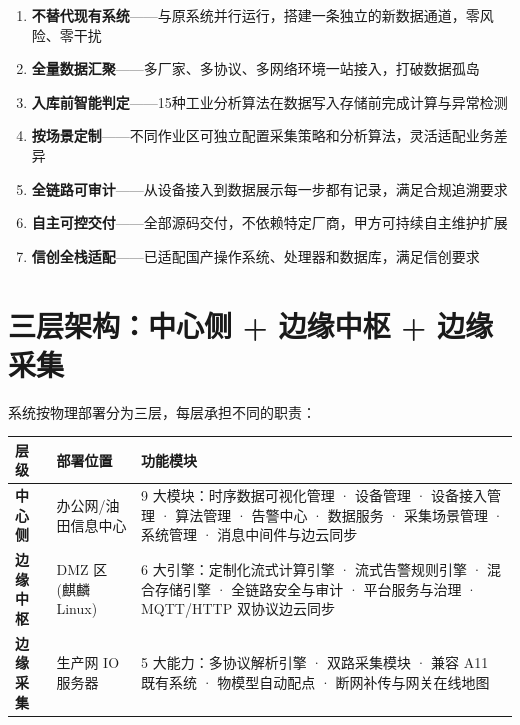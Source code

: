 \documentclass[11pt,a4paper]{ctexart}
\begin{document}
\begin{enumerate}[leftmargin=*]
  \item \textbf{不替代现有系统}——与原系统并行运行，搭建一条独立的新数据通道，零风险、零干扰
  \item \textbf{全量数据汇聚}——多厂家、多协议、多网络环境一站接入，打破数据孤岛
  \item \textbf{入库前智能判定}——15种工业分析算法在数据写入存储前完成计算与异常检测
  \item \textbf{按场景定制}——不同作业区可独立配置采集策略和分析算法，灵活适配业务差异
  \item \textbf{全链路可审计}——从设备接入到数据展示每一步都有记录，满足合规追溯要求
  \item \textbf{自主可控交付}——全部源码交付，不依赖特定厂商，甲方可持续自主维护扩展
  \item \textbf{信创全栈适配}——已适配国产操作系统、处理器和数据库，满足信创要求
\end{enumerate}

\section{三层架构：中心侧 + 边缘中枢 + 边缘采集}

系统按物理部署分为三层，每层承担不同的职责：

\begin{table}[H]\centering
\begin{tabular}{p{3cm}p{5.5cm}p{5.5cm}}
\toprule
\textbf{层级} & \textbf{部署位置} & \textbf{功能模块} \\
\midrule
\textbf{中心侧} & 办公网/油田信息中心 & 9 大模块：时序数据可视化管理 · 设备管理 · 设备接入管理 · 算法管理 · 告警中心 · 数据服务 · 采集场景管理 · 系统管理 · 消息中间件与边云同步 \\
\textbf{边缘中枢} & DMZ 区 (麒麟 Linux) & 6 大引擎：定制化流式计算引擎 · 流式告警规则引擎 · 混合存储引擎 · 全链路安全与审计 · 平台服务与治理 · MQTT/HTTP 双协议边云同步 \\
\textbf{边缘采集} & 生产网 IO 服务器 & 5 大能力：多协议解析引擎 · 双路采集模块 · 兼容 A11 既有系统 · 物模型自动配点 · 断网补传与网关在线地图 \\
\bottomrule
\end{tabular}
\end{table}
\end{document}
